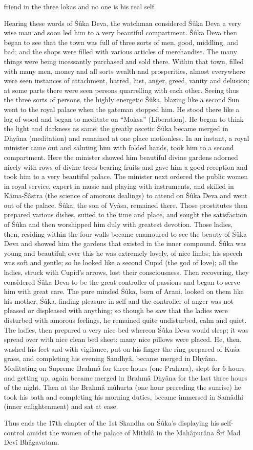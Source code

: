 friend in the three lokas and no one is his real self.

Hearing these words of \'S\^uka Deva, the watchman considered \'S\^uka Deva a very wise man and soon led him to a very beautiful compartment. \'S\^uka Deva then began to see that the town was full of three sorts of men, good, middling, and bad; and the shops were filled with various articles of merchandise. The many things were being incessantly purchased and sold there. Within that town, filled with many men, money and all sorts wealth and prosperities, almost everywhere were seen instances of attachment, hatred, lust, anger, greed, vanity and delusion; at some parts there were seen persons quarrelling with each other. Seeing thus the three sorts of persons, the highly energetic \'S\^uka, blazing like a second Sun went to the royal palace when the gateman stopped him. He stood there like a log of wood and began to meditate on ``Moksa'' (Liberation). He began to think the light and darkness as same; the greatly ascetic \'S\^uka became merged in Dhy\^ana (meditation) and remained at one place motionless. In an instant, a royal minister came out and saluting him with folded hands, took him to a second compartment. Here the minister showed him beautiful divine gardens adorned nicely with rows of divine trees bearing fruits and gave him a good reception and took him to a very beautiful palace. The minister next ordered the public women in royal service, expert in music and playing with instruments, and skilled in K\^ama-\'S\^astra (the science of amorous dealings) to attend on \'S\^uka Deva and went out of the palace. \'S\^uka, the son of Vy\^asa, remained there. Those prostitutes then prepared various dishes, suited to the time and place, and sought the satisfaction of \'S\^uka and then worshipped him duly with greatest devotion. Those ladies, then, residing within the four walls became enamoured to see the beauty of \'S\^uka Deva and showed him the gardens that existed in the inner compound. \'S\^uka was young and beautiful; over this he was extremely lovely, of nice limbs; his speech was soft and gentle; so he looked like a second Cupid (the god of love); all the ladies, struck with Cupid’s arrows, lost their consciousness. Then recovering, they considered \'S\^uka Deva to be the great controller of passions and began to serve him with great care. The pure minded \'S\^uka, born of Arani, looked on them like his mother. \'S\^uka, finding pleasure in self and the controller of anger was not pleased or displeased with anything; so though be saw that the ladies were disturbed with amorous feelings, he remained quite undisturbed, calm and quiet. The ladies, then prepared a very nice bed whereon \'S\^uka Deva would sleep; it was spread over with nice clean bed sheet; many nice pillows were placed. He, then, washed his feet and with vigilance, put on his finger the ring prepared of Ku\'sa grass, and completing his evening Sandhy\^a, became merged in Dhy\^ana. Meditating on Supreme Brahm\^a for three hours (one Prahara), slept for 6 hours and getting up, again became merged in Brahm\^a Dhy\^ana for the last three hours of the night. Then at the Brahm\^a m\^uhurta (one hour preceding the sunrise) he took his bath and completing his morning duties, became immersed in Sam\^adhi (inner enlightenment) and sat at ease.

Thus ends the 17th chapter of the 1st Skandha on \'S\^uka's displaying his self-control amidst the women of the palace of Mithil\^a in the Mah\^apur\^ana \'Sr\^i Mad Dev\^i Bh\^agavatam.
